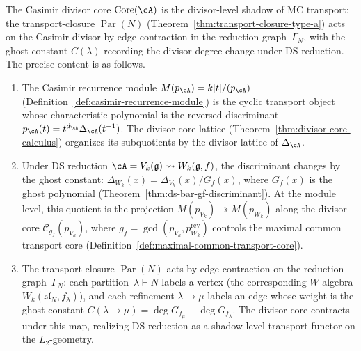 \begin{construction}
\label{constr:casimir-divisor-shadow}
The Casimir divisor core $\operatorname{Core}(\cA)$ is the
divisor-level shadow of MC transport: the transport-closure
$\operatorname{Par}(N)$
(Theorem~\ref{thm:transport-closure-type-a}) acts on the
Casimir divisor by edge contraction in the reduction
graph~$\Gamma_N$, with the ghost constant $C(\lambda)$
recording the divisor degree change under DS reduction.
The precise content is as follows.
\begin{enumerate}[label=\textup{(\roman*)}]
\item The Casimir recurrence module
  $M(p_\cA) = k[t]/(p_\cA)$
  (Definition~\ref{def:casimir-recurrence-module}) is the
  cyclic transport object whose characteristic polynomial is
  the reversed discriminant
  $p_\cA(t) = t^{d_\cA}\Delta_\cA(t^{-1})$.
  The divisor-core lattice
  (Theorem~\ref{thm:divisor-core-calculus})
  organizes its subquotients by the divisor lattice of
  $\Delta_\cA$.
\item Under DS reduction $\cA = V_k(\mathfrak{g})
  \rightsquigarrow W_k(\mathfrak{g}, f)$, the
  discriminant changes by the ghost constant:
  $\Delta_{W_k}(x) = \Delta_{V_k}(x)/G_f(x)$,
  where $G_f(x)$ is the ghost polynomial
  (Theorem~\ref{thm:ds-bar-gf-discriminant}).
  At the module level, this quotient is the
  projection $M(p_{V_k}) \twoheadrightarrow M(p_{W_k})$
  along the divisor core $\mathcal{C}_{g_f}(p_{V_k})$,
  where $g_f = \gcd(p_{V_k}, p_{W_k}^{\mathrm{rev}})$
  controls the maximal common transport core
  (Definition~\ref{def:maximal-common-transport-core}).
\item The transport-closure $\operatorname{Par}(N)$
  acts by edge contraction on the reduction
  graph~$\Gamma_N$: each partition~$\lambda \vdash N$
  labels a vertex (the corresponding $W$-algebra
  $W_k(\mathfrak{sl}_N, f_\lambda)$), and each
  refinement $\lambda \to \mu$ labels an edge whose
  weight is the ghost constant
  $C(\lambda \to \mu)
  = \deg G_{f_\mu} - \deg G_{f_\lambda}$.
  The divisor core contracts under this map, realizing
  DS reduction as a shadow-level transport functor on the
  $L_2$-geometry.
\end{enumerate}
\end{construction}
